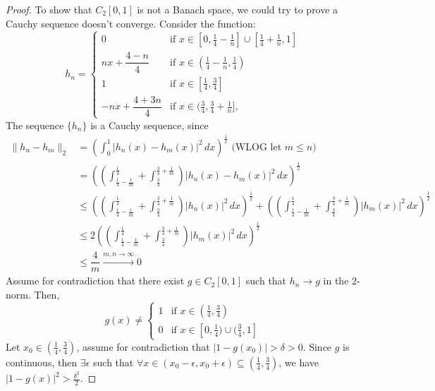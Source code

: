 \begin{answer}
\begin{proof}
        To show that $C_2[0,1]$ is not a Banach space, we could try to prove a Cauchy sequence doesn't converge. Consider the function:
        \begin{equation}
            h_n =
            \begin{cases}
                0 & \text{if $x \in [0,\tfrac{1}{4} - \tfrac{1}{n}] \cup [\tfrac{1}{4} + \tfrac{1}{n}, 1]$}\\
                nx + \dfrac{4-n}{4} & \text{if $x \in (\tfrac{1}{4}-\tfrac{1}{n}, \tfrac{1}{4})$}\\
                1 & \text{if $x \in [\tfrac{1}{4}, \tfrac{3}{4}]$}\\
                -nx +\dfrac{4+3n}{4} & \text{if $x \in (\tfrac{3}{4}, \tfrac{3}{4} + \tfrac{1}{n}]$},
            \end{cases}
        \end{equation}
        The sequence $\{h_n\}$ is a Cauchy sequence, since
        \begin{equation}
            \begin{aligned}
                \lVert h_n - h_m \rVert_2 &= \left(\int_0^1 \lvert h_n(x) - h_m(x) \rvert^2 \,dx\right)^{\frac{1}{2}} \text{ (WLOG let $m \leq n$)}\\
                &=\left(\left(\int_{\frac{1}{4}-\frac{1}{m}}^{\frac{1}{4}} + \int_{\frac{3}{4}}^{\frac{3}{4} + \frac{1}{m}}\right) \lvert h_n(x) - h_m(x) \rvert^2\,dx \right)^{\frac{1}{2}}\\
                &\leq \left(\left(\int_{\frac{1}{4}-\frac{1}{m}}^{\frac{1}{4}} + \int_{\frac{3}{4}}^{\frac{3}{4} + \frac{1}{m}}\right) \lvert h_n(x) \rvert^2\,dx \right)^{\frac{1}{2}} + \left(\left(\int_{\frac{1}{4}-\frac{1}{m}}^{\frac{1}{4}} + \int_{\frac{3}{4}}^{\frac{3}{4} + \frac{1}{m}}\right) \lvert h_m(x) \rvert^2\,dx \right)^{\frac{1}{2}}\\
                & \leq 2\left(\left(\int_{\frac{1}{4}-\frac{1}{m}}^{\frac{1}{4}} + \int_{\frac{3}{4}}^{\frac{3}{4} + \frac{1}{m}}\right) \lvert h_m(x) \rvert^2\,dx \right)^{\frac{1}{2}}\\
                & \leq \dfrac{4}{m} \xrightarrow{m,n \to \infty} 0
            \end{aligned}
        \end{equation}
        Assume for contradiction that there exist $g \in C_2[0,1]$ such that $h_n \to g$ in the $2$-norm. Then, 
        \begin{equation}
            g(x) \neq
            \begin{cases}
                1 & \text{if $x \in (\tfrac{1}{4},\tfrac{3}{4})$}\\
                0 & \text{if $x \in [0,\tfrac{1}{4})\cup(\tfrac{3}{4},1]$}
            \end{cases}
        \end{equation}
        Let $x_0 \in (\tfrac{1}{4},\tfrac{3}{4})$, assume for contradiction that $\lvert 1 - g(x_0) \rvert > \delta > 0$. Since $g$ is continuous, then $\exists \epsilon$ such that $\forall x \in (x_0 - \epsilon, x_0+\epsilon) \subseteq (\tfrac{1}{4},\tfrac{3}{4})$, we have $\lvert 1 - g(x)\rvert^2 > \tfrac{\delta^2}{2}$.
        

\end{proof}
\end{answer}
